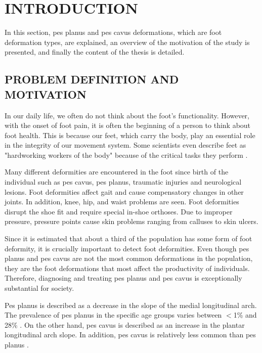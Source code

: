 \chapter{INTRODUCTION}\label{chp:Introduction}

In this section, pes planus and pes cavus deformations, which are foot deformation types, are explained, an overview of the motivation of the study is presented, and finally the content of the thesis is detailed.

\section{PROBLEM DEFINITION AND MOTIVATION}

In our daily life, we often do not think about the foot's functionality. However, with the onset of foot pain, it is often the beginning of a person to think about foot health. This is because our feet, which carry the body, play an essential role in the integrity of our movement system. Some scientists even describe feet as "hardworking workers of the body" because of the critical tasks they perform \cite{veli2004shoes}.

Many different deformities are encountered in the foot since birth of the individual such as pes cavus, pes planus, traumatic injuries and neurological lesions. Foot deformities affect gait and cause compensatory changes in other joints. In addition, knee, hip, and waist problems are seen. Foot deformities disrupt the shoe fit and require special in-shoe orthoses. Due to improper pressure, pressure points cause skin problems ranging from calluses to skin ulcers.

Since it is estimated that about a third of the population has some form of foot deformity, it is crucially important to detect foot deformities. Even though pes planus and pes cavus are not the most common deformations in the population, they are the foot deformations that most affect the productivity of individuals. Therefore, diagnosing and treating pes planus and pes cavus is exceptionally substantial for society.

Pes planus is described as a decrease in the slope of the medial longitudinal arch. The prevalence of pes planus in the specific age groups varies between $<$1\% and 28\%  \cite{ccilli2009prevalence, pfeiffer2006prevalence, abdel2006flat, chen2009flatfoot}. On the other hand, pes cavus is described as an increase in the plantar longitudinal arch slope. In addition, pes cavus is relatively less common than pes planus \cite{kharbuja2017prevalence}.

